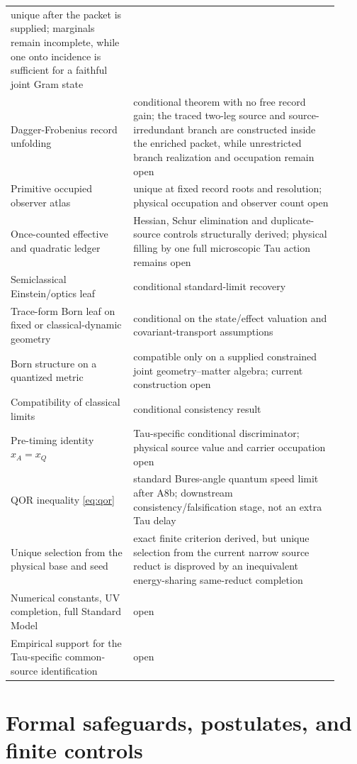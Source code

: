 \documentclass[11pt]{article}
\begin{document}
\begin{longtable}{L{0.34\linewidth}L{0.58\linewidth}}
unique after the packet is supplied; marginals remain incomplete, while one
onto incidence is sufficient for a faithful joint Gram state\\
Dagger-Frobenius record unfolding & conditional theorem with no free record
gain; the traced two-leg source and source-irredundant branch are constructed
inside the enriched packet, while unrestricted branch realization and
occupation remain open\\
Primitive occupied observer atlas & unique at fixed record roots and
resolution; physical occupation and observer count open\\
Once-counted effective and quadratic ledger & Hessian, Schur elimination and
duplicate-source controls structurally derived; physical filling by one full
microscopic Tau action remains open\\
Semiclassical Einstein/optics leaf & conditional standard-limit recovery\\
Trace-form Born leaf on fixed or classical-dynamic geometry & conditional on
the state/effect valuation and covariant-transport assumptions\\
Born structure on a quantized metric & compatible only on a supplied
constrained joint geometry--matter algebra; current construction open\\
Compatibility of classical limits & conditional consistency result\\
Pre-timing identity \(x_A=x_Q\) & Tau-specific conditional discriminator;
physical source value and carrier occupation open\\
QOR inequality \eqref{eq:qor} & standard Bures-angle quantum speed limit after
A8b; downstream consistency/falsification stage, not an extra Tau delay\\
Unique selection from the physical base and seed & exact finite criterion
derived, but unique selection from the current narrow source reduct is
disproved by an inequivalent energy-sharing same-reduct completion\\
Numerical constants, UV completion, full Standard Model & open\\
Empirical support for the Tau-specific common-source identification & open\\
\bottomrule
\end{longtable}
\normalsize


\section{Formal safeguards, postulates, and finite controls}
\end{document}
